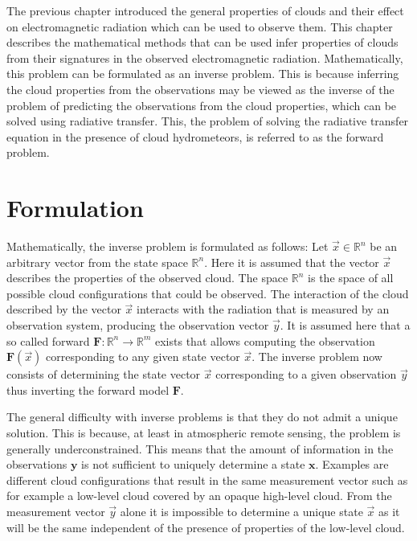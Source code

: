 The previous chapter introduced the general properties of clouds and  their
effect on electromagnetic radiation which can be used to observe them. This
chapter describes the mathematical methods that can be used infer properties
of clouds from their signatures in the observed electromagnetic radiation.
Mathematically, this problem can be formulated as an inverse problem. This is
because inferring the cloud properties from the observations may be viewed as the
inverse of the problem of predicting the observations from the cloud properties,
which can be solved using radiative transfer. This, the problem of solving
the radiative transfer equation in the presence of cloud hydrometeors, is referred
to as the forward problem.

\section{Formulation}

Mathematically, the inverse problem is formulated as follows: Let $\vec{x} \in
\mathbb{R}^n$ be an arbitrary vector from the state space $\mathbb{R}^n$. Here
it is assumed that the vector $\vec{x}$ describes the properties of the observed
cloud. The space $\mathbb{R}^n$ is the space of all possible cloud
configurations that could be observed. The interaction of the cloud described by
the vector $\vec{x}$ interacts with the radiation that is measured by an
observation system, producing the observation vector $\vec{y}$. It is assumed
here that a so called forward $\mathbf{F}: \mathbb{R}^n \rightarrow
\mathbb{R}^m$ exists that allows computing the observation $\mathbf{F}(\vec{x})$
corresponding to any given state vector $\vec{x}$. The inverse problem
now consists of determining the state vector $\vec{x}$ corresponding to
a given observation $\vec{y}$ thus inverting the forward model $\mathbf{F}$.

The general difficulty with inverse problems is that they do not admit
a unique solution. This is because, at least in atmospheric remote sensing, the
problem is generally underconstrained. This means that the amount of information
in the observations $\mathbf{y}$ is not sufficient to uniquely determine a state
$\mathbf{x}$. Examples are different cloud configurations that result in the
same measurement vector such as for example a low-level cloud covered by an
opaque high-level cloud. From the measurement vector $\vec{y}$ alone it is
impossible to determine a unique state $\vec{x}$ as it will be the same
independent of the presence of properties of the low-level cloud.

